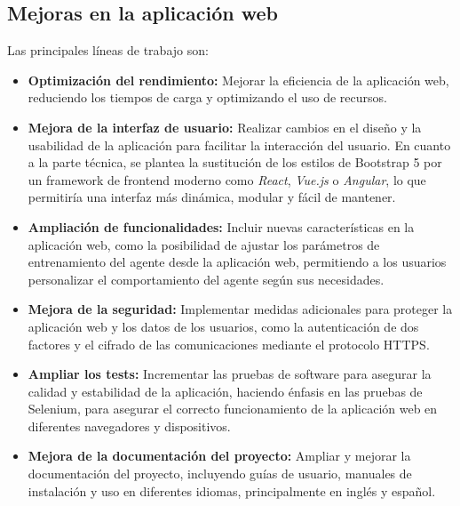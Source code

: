 \subsection{Mejoras en la aplicación web}
Las principales líneas de trabajo son:
\begin{itemize}
    \item \textbf{Optimización del rendimiento:} Mejorar la eficiencia de la aplicación web, reduciendo los tiempos de carga y optimizando el uso de recursos.
    \item \textbf{Mejora de la interfaz de usuario:} Realizar cambios en el diseño y la usabilidad de la aplicación para facilitar la interacción del usuario. En cuanto a la parte técnica, se plantea la sustitución de los estilos de Bootstrap 5 por un framework de frontend moderno como \textit{React}, \textit{Vue.js} o \textit{Angular}, lo que permitiría una interfaz más dinámica, modular y fácil de mantener.
    \item \textbf{Ampliación de funcionalidades:} Incluir nuevas características en la aplicación web, como la posibilidad de ajustar los parámetros de entrenamiento del agente desde la aplicación web, permitiendo a los usuarios personalizar el comportamiento del agente según sus necesidades.
    \item \textbf{Mejora de la seguridad:} Implementar medidas adicionales para proteger la aplicación web y los datos de los usuarios, como la autenticación de dos factores y el cifrado de las comunicaciones mediante el protocolo HTTPS.
    \item \textbf{Ampliar los tests:} Incrementar las pruebas de software para asegurar la calidad y estabilidad de la aplicación, haciendo énfasis en las pruebas de Selenium, para asegurar el correcto funcionamiento de la aplicación web en diferentes navegadores y dispositivos.
    \item \textbf{Mejora de la documentación del proyecto:} Ampliar y mejorar la documentación del proyecto, incluyendo guías de usuario, manuales de instalación y uso en diferentes idiomas, principalmente en inglés y español.
\end{itemize}
